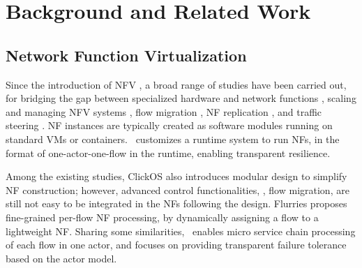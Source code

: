 \section{Background and Related Work}
\label{sec:relatedwork}



\subsection{Network Function Virtualization}

Since the introduction of NFV \cite{nfv_whitepaper}, %
 a broad range of studies have been carried out, for bridging the gap between specialized hardware and network functions \cite{hwang2015netvm, Han:EECS-2015-155, martins2014clickos, 199352}, scaling and managing NFV systems \cite{gember2012stratos, palkar2015e2}, flow migration \cite{rajagopalan2013split, khalid2016paving, gember2015opennf}, NF replication \cite{rajagopalan2013pico, sherry2015rollback}, and traffic steering \cite{simplifying}. %
NF instances are typically created as software modules running on standard VMs or containers. \nfactor~customizes a runtime system to run NFs, in the format of one-actor-one-flow in the runtime, enabling transparent resilience. %
 
 

Among the existing studies, ClickOS  \cite{martins2014clickos} %
also introduces modular design to simplify NF construction; however, advanced control functionalities, \eg, flow migration, are still not easy to be integrated in the NFs following the design. 
Flurries \cite{zhang2016flurries} proposes fine-grained per-flow NF processing, by dynamically assigning a flow to a lightweight NF. Sharing some similarities, \nfactor~enables micro service chain processing of each flow in one actor, and focuses on providing transparent failure tolerance based on the actor model. 

